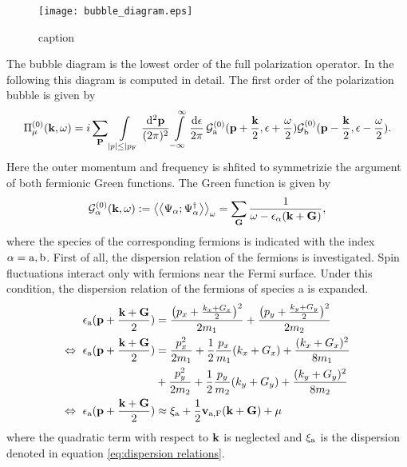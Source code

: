 %
\begin{figure}[t]
	\centering
	\texttt{[image: bubble\_diagram.eps]}
	\caption{caption}
	\label{fig:bubble diagram}
\end{figure}
%
The bubble diagram is the lowest order of the full polarization operator.
In the following this diagram is computed in detail.
The first order of the polarization bubble is given by
%
\begin{align}
	\Pi_{\mu}^{(0)}(\vb{k}, \omega) = 
		i 
		\sum\limits_{\vb{P}}
		\int\limits_{|p| \leq |p_{\mathrm{F}}} \frac{\dd[2]{\vb{p}}}{(2\pi)^{2}} 
		\int\limits_{-\infty}^{\infty} \frac{\dd{\epsilon}}{2\pi}\,
		\mathcal{G}_{\mathrm{a}}^{(0)}(\vb{p}+\frac{\vb{k}}{2}, \epsilon+\frac{\omega}{2})
		\mathcal{G}_{\mathrm{b}}^{(0)}(\vb{p}-\frac{\vb{k}}{2}, \epsilon-\frac{\omega}{2}).
\end{align}
%
Here the outer momentum and frequency is shfited to symmetrizie the argument of both fermionic Green functions.
The Green function is given by
%
\begin{align}
	 \mathcal{G}_{\alpha}^{(0)}(\vb{k},\omega) := \big\langle\big\langle{\Psi_{\alpha}};{\Psi_{\alpha}^{\dag}}\big\rangle\big\rangle_{\omega} = \sum\limits_{\vb{G}} \frac{1}{\omega - \epsilon_{\alpha}(\vb{k}+\vb{G})}, 
	 \label{appeq:free electron propagator}
\end{align}
%
where the species of the corresponding fermions is indicated with the index $\alpha = \mathrm{a},\mathrm{b}$.
First of all, the dispersion relation of the fermions is investigated.
Spin fluctuations interact only with fermions near the Fermi surface.
Under this condition, the dispersion relation of the fermions of species a is expanded.
%
\begin{align}
	\epsilon_{\mathrm{a}}(\vb{p} + \frac{\vb{k} + \vb{G}}{2}) &= 
		\frac{\big(p_{x} + \frac{k_{x} + G_{x}}{2}\big)^{2}}{2m_{1}} 
		+ 
		\frac{\big(p_{y} + \frac{k_{y} + G_{y}}{2}\big)^{2}}{2m_{2}} 
		\notag \\ 
	\Leftrightarrow\ \epsilon_{\mathrm{a}}(\vb{p} + \frac{\vb{k} + \vb{G}}{2}) &=
		\frac{p_{x}^{2}}{2m_{1}} + \frac{1}{2} \frac{p_{x}}{m_{1}}(k_{x}+G_{x}) + \frac{(k_{x}+G_{x})^{2}}{8m_{1}}
		\notag \\ &+
		\frac{p_{y}^{2}}{2m_{2}} + \frac{1}{2} \frac{p_{y}}{m_{2}}(k_{y}+G_{y}) + \frac{(k_{y}+G_{y})^{2}}{8m_{2}}
		\notag \\
	\Leftrightarrow\ \epsilon_{\mathrm{a}}(\vb{p} + \frac{\vb{k} + \vb{G}}{2}) &\approx
		\xi_{\mathrm{a}} + \frac{1}{2} \vb{v}_{\mathrm{a,F}}(\vb{k} + \vb{G}) + \mu
\end{align} 
%
where the quadratic term with respect to $\vb{k}$ is neglected and $\xi_{\mathrm{a}}$ is the dispersion denoted in equation \eqref{eq:dispersion relations}.
